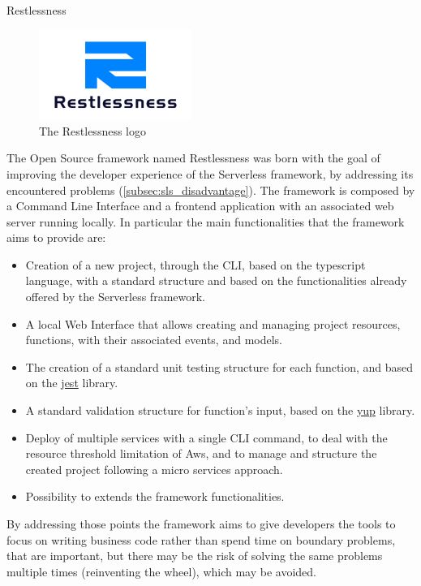 \begin{chapter}{Restlessness}
    \label{chap:restlessness}

    \begin{figure}
        \centering
        \includegraphics[width=5cm]{source/images/restlessness_logo.png}
        \caption{The Restlessness logo}
    \end{figure}


    The Open Source framework named Restlessness was born with the goal of improving
    the developer experience of the Serverless framework, by addressing its encountered
    problems (\ref{subsec:sls_disadvantage}).
    The framework is composed by a Command Line Interface and a frontend application
    with an associated web server running locally.
    In particular the main functionalities that the framework aims to provide are:
    \begin{itemize}
        \item Creation of a new project, through the CLI, based on the typescript
            language, with a standard structure and based on the functionalities
            already offered by the Serverless framework.
        \item A local Web Interface that allows creating and managing project resources,
            functions, with their associated events, and models.
        \item The creation of a standard unit testing structure for each function,
            and based on the \href{https://www.npmjs.com/package/jest}{jest} library.
        \item A standard validation structure for function's input, based on the
            \href{https://www.npmjs.com/package/yup}{yup} library.
        \item Deploy of multiple services with a single CLI command, to deal with
            the resource threshold limitation of Aws, and to manage and structure
            the created project following a micro services approach.
        \item Possibility to extends the framework functionalities.
    \end{itemize}
    By addressing those points the framework aims to give developers the tools to
    focus on writing business code rather than spend time on boundary problems,
    that are important, but there may be the risk of solving the same problems
    multiple times (reinventing the wheel), which may be avoided.


\end{chapter}
